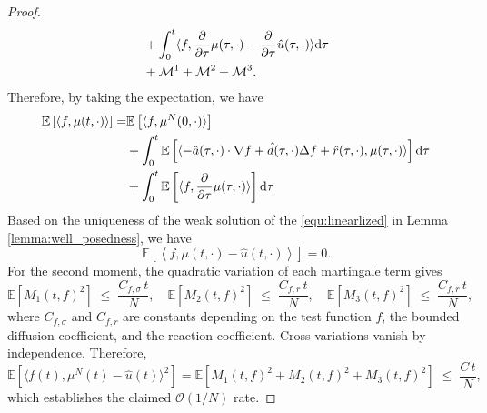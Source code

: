 \documentclass[preprint,12pt]{elsarticle}
\theoremstyle{definition}
\theoremstyle{remark}
\begin{document}
\begin{proof}
\begin{equation*}
\begin{aligned}
         & + \int_0^t\langle f ,\frac{\partial}{\partial \tau} \mu(\tau,\cdot)-\frac{\partial}{\partial \tau} \hat u(\tau,\cdot)\rangle\mathrm{d} \tau\\
         & + \mathcal M^1+\mathcal M^2 + \mathcal M^3.
    \end{aligned}
\end{equation*}
Therefore, by taking the expectation, we have 
\begin{equation}
\begin{aligned}
        \mathbb E \left[\left\langle f,\mu(t,\cdot) \right\rangle\right] = &
          \mathbb E \left[\langle f, \mu^N(0,\cdot) \rangle\right] \\
         &  +\int_0^t\mathbb E \left[ \langle -\hat a(\tau,\cdot)\cdot \nabla f  + \hat d(\tau,\cdot) \Delta f +\hat r(\tau,\cdot),\mu(\tau,\cdot)\rangle\right]\mathrm{d} \tau\\
         & + \int_0^t\mathbb E \left[ \langle f ,\frac{\partial}{\partial \tau} \mu(\tau,\cdot)\rangle\right]\mathrm{d} \tau\\
\end{aligned}
\end{equation}
Based on the uniqueness of the weak solution of the \eqref{equ:linearlized} in Lemma \ref{lemma:well_posedness}, we  have 
\begin{equation}
    \mathbb E \left[\left\langle f,\mu(t,\cdot)-\hat u(t,\cdot) \right\rangle\right] = 0.
\end{equation}
For the second moment, the quadratic variation of each martingale term gives
\[
\mathbb{E}\!\left[ M_1(t,f)^2 \right] \;\le\; \frac{C_{f,\sigma}\,t}{N}, 
\quad 
\mathbb{E}\!\left[ M_2(t,f)^2 \right] \;\le\; \frac{C_{f,r}\,t}{N}, 
\quad 
\mathbb{E}\!\left[ M_3(t,f)^2 \right] \;\le\; \frac{C_{f,r}\,t}{N},
\]
where $C_{f,\sigma}$ and $C_{f,r}$ are constants depending on the test function 
$f$, the bounded diffusion coefficient, and the reaction coefficient. 
Cross-variations vanish by independence. Therefore,
\[
\mathbb{E}\!\left[\langle f(t), \mu^N(t) - \hat u(t) \rangle^2\right]
= \mathbb{E}\!\left[ M_1(t,f)^2 + M_2(t,f)^2 + M_3(t,f)^2 \right] 
\;\le\; \frac{C\,t}{N},
\]
which establishes the claimed $\mathcal{O}(1/N)$ rate.
\end{proof}
\end{document}
